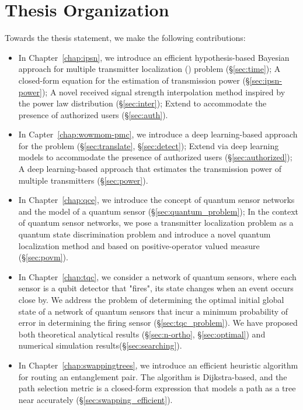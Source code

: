 \section{Thesis Organization}

Towards the thesis statement, we make the following contributions:

\begin{itemize}
    \item In Chapter~\ref{chap:ipsn}, we introduce an efficient hypothesis-based Bayesian approach \ouralgo for multiple transmitter localization (\mtl) problem (\S\ref{sec:time}); 
          A closed-form equation for the estimation of transmission power (\S\ref{sec:ipsn-power});
          A novel received signal strength interpolation method inspired by the power law distribution (\S\ref{sec:inter});
          Extend \ouralgo to accommodate the presence of authorized users (\S\ref{sec:auth}).
    
    \item In Capter~\ref{chap:wowmom-pmc}, we introduce a deep learning-based approach \our for the \mtl problem (\S\ref{sec:translate}, \S\ref{sec:detect});
          Extend \our via deep learning models to accommodate the presence of authorized users (\S\ref{sec:authorized});
          A deep learning-based approach that estimates the transmission power of multiple transmitters (\S\ref{sec:power}).
    
    \item In Chapter~\ref{chap:qce}, we introduce the concept of quantum sensor networks and the model of a quantum sensor (\S\ref{sec:quantum_problem});
          In the context of quantum sensor networks, we pose a transmitter localization problem as a quantum state discrimination problem 
          and introduce a novel quantum localization method \povm and \povmpro based on positive-operator valued measure (\S\ref{sec:povm}).
    
    \item In Chapter~\ref{chap:tqc}, we consider a network of quantum sensors, where each sensor is a qubit detector that "fires", its state changes when an event occurs close by.
          We address the problem of determining the optimal initial global state of a network of quantum sensors that incur a minimum probability of error in determining the firing sensor (\S\ref{sec:tqc_problem}).
          We have proposed both theoretical analytical results (\S\ref{sec:n-ortho}, \S\ref{sec:optimal}) and numerical simulation results(\S\ref{sec:searching}).
          
    \item In Chapter~\ref{chap:swappingtrees}, we introduce an efficient heuristic algorithm \dpalt for routing an entanglement pair.
          The algorithm is Dijkstra-based, and the path selection metric is a closed-form expression that models a path as a tree near accurately (\S\ref{sec:swapping_efficient}).
\end{itemize}


